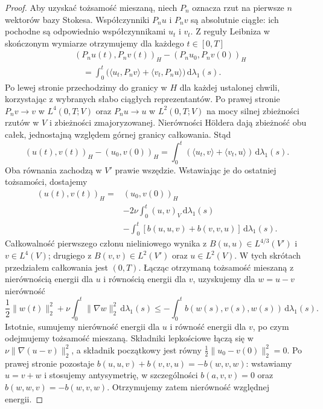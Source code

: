 \begin{proof}
Aby uzyskać tożsamość mieszaną, niech $P_n$ oznacza
rzut na pierwsze $n$ wektorów bazy Stokesa.
Współczynniki $P_nu$ i $P_nv$ są absolutnie ciągłe:
ich pochodne są odpowiednio współczynnikami $u_t$
i $v_t$. Z reguły Leibniza w skończonym wymiarze
otrzymujemy dla każdego $t\in[0,T]$
\[
 \begin{aligned}
 &(P_nu(t),P_nv(t))_H-(P_nu_0,P_nv(0))_H\\
 &\quad=\int_0^t
 \bigl(\langle u_t,P_nv\rangle+\langle v_t,P_nu\rangle\bigr)
 \,\mathrm d\lambda_1(s).
 \end{aligned}
\]
Po lewej stronie przechodzimy do granicy w $H$
dla każdej ustalonej chwili, korzystając z
wybranych słabo ciągłych reprezentantów.
Po prawej stronie $P_nv\to v$ w $L^4(0,T;V)$
oraz $P_nu\to u$ w $L^2(0,T;V)$ na mocy
silnej zbieżności rzutów w $V$ i zbieżności zmajoryzowanej.
Nierówności Höldera dają zbieżność obu całek,
jednostajną względem górnej granicy całkowania.
Stąd
\[
 (u(t),v(t))_H-(u_0,v(0))_H
 =\int_0^t
 (\langle u_t,v\rangle+\langle v_t,u\rangle)
 \,\mathrm d\lambda_1(s).
\]
Oba równania zachodzą w $V'$ prawie wszędzie.
Wstawiając je do ostatniej tożsamości, dostajemy
\[
 \begin{aligned}
 (u(t),v(t))_H={}&(u_0,v(0))_H\\
 &-2\nu\int_0^t(u,v)_V\,\mathrm d\lambda_1(s)\\
 &-\int_0^t
 [b(u,u,v)+b(v,v,u)]\,\mathrm d\lambda_1(s).
 \end{aligned}
\]
Całkowalność pierwszego członu nieliniowego
wynika z $B(u,u)\in L^{4/3}(V')$ i $v\in L^4(V)$;
drugiego z $B(v,v)\in L^2(V')$
oraz $u\in L^2(V)$. W tych skrótach przedziałem
całkowania jest $(0,T)$.
Łącząc otrzymaną tożsamość mieszaną z nierównością
energii dla $u$ i równością energii dla $v$,
uzyskujemy dla $w=u-v$ nierówność
\[
 \frac12\|w(t)\|_2^2+\nu\int_0^t\|\nabla w\|_2^2\,\mathrm d\lambda_1(s)
 \le-\int_0^t b(w(s),v(s),w(s))\,\mathrm d\lambda_1(s).
\]
Istotnie, sumujemy nierówność energii dla $u$
i równość energii dla $v$, po czym odejmujemy
tożsamość mieszaną. Składniki lepkościowe łączą się
w $\nu\|\nabla(u-v)\|_2^2$, a składnik początkowy
jest równy $\frac12\|u_0-v(0)\|_2^2=0$.
Po prawej stronie pozostaje
$b(u,u,v)+b(v,v,u)=-b(w,v,w)$:
wstawiamy $u=v+w$ i stosujemy antysymetrię,
w szczególności $b(a,v,v)=0$ oraz
$b(w,w,v)=-b(w,v,w)$.
Otrzymujemy zatem nierówność względnej energii.


\end{proof}
